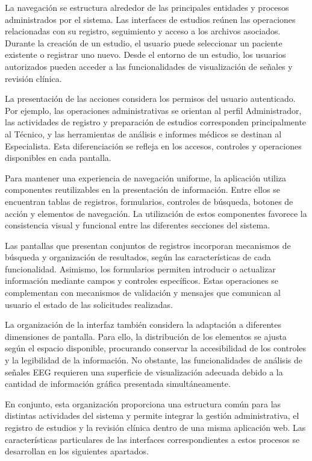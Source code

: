 La navegación se estructura alrededor de las principales entidades y procesos administrados por el sistema. Las interfaces de estudios reúnen las operaciones relacionadas con su registro, seguimiento y acceso a los archivos asociados. Durante la creación de un estudio, el usuario puede seleccionar un paciente existente o registrar uno nuevo. Desde el entorno de un estudio, los usuarios autorizados pueden acceder a las funcionalidades de visualización de señales y revisión clínica.

La presentación de las acciones considera los
permisos del usuario autenticado. Por ejemplo,
las operaciones administrativas se orientan al
perfil Administrador, las actividades de registro
y preparación de estudios corresponden principalmente
al Técnico, y las herramientas de análisis e
informes médicos se destinan al Especialista.
Esta diferenciación se refleja en los accesos,
controles y operaciones disponibles en cada pantalla.

Para mantener una experiencia de navegación
uniforme, la aplicación utiliza componentes
reutilizables en la presentación de información.
Entre ellos se encuentran tablas de registros,
formularios, controles de búsqueda, botones
de acción y elementos de navegación. La utilización
de estos componentes favorece la consistencia
visual y funcional entre las diferentes secciones
del sistema.

Las pantallas que presentan conjuntos de registros
incorporan mecanismos de búsqueda y organización
de resultados, según las características de cada
funcionalidad. Asimismo, los formularios permiten
introducir o actualizar información mediante
campos y controles específicos. Estas operaciones
se complementan con mecanismos de validación
y mensajes que comunican al usuario el estado
de las solicitudes realizadas.

La organización de la interfaz también considera
la adaptación a diferentes dimensiones de pantalla.
Para ello, la distribución de los elementos se
ajusta según el espacio disponible, procurando
conservar la accesibilidad de los controles y
la legibilidad de la información. No obstante,
las funcionalidades de análisis de señales EEG
requieren una superficie de visualización adecuada
debido a la cantidad de información gráfica
presentada simultáneamente.

En conjunto, esta organización proporciona
una estructura común para las distintas actividades
del sistema y permite integrar la gestión
administrativa, el registro de estudios y la
revisión clínica dentro de una misma aplicación
web. Las características particulares de las
interfaces correspondientes a estos procesos
se desarrollan en los siguientes apartados.


